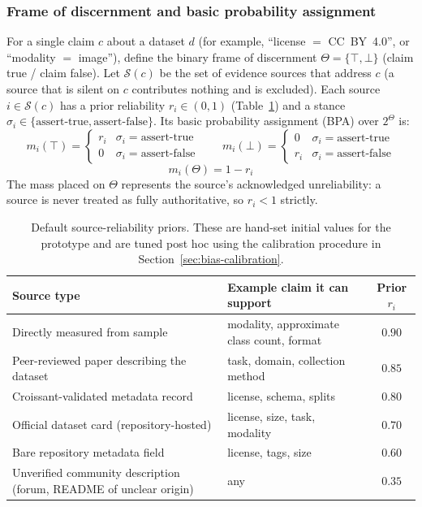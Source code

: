 \documentclass[11pt]{article}
\begin{document}
\subsubsection{Frame of discernment and basic probability assignment}
For a single claim $c$ about a dataset $d$ (for example, ``license $=$ CC~BY~4.0'', or ``modality $=$
image''), define the binary frame of discernment $\Theta = \{\top, \bot\}$ (claim true / claim false).
Let $\mathcal{S}(c)$ be the set of evidence sources that address $c$ (a source that is silent on $c$
contributes nothing and is excluded). Each source $i \in \mathcal{S}(c)$ has a prior reliability
$r_i \in (0,1)$ (Table~\ref{tab:reliability}) and a stance $\sigma_i \in \{\text{assert-true},
\text{assert-false}\}$. Its basic probability assignment (BPA) over $2^\Theta$ is:
\begin{equation}
m_i(\top) = \begin{cases} r_i & \sigma_i = \text{assert-true} \\ 0 & \sigma_i = \text{assert-false}\end{cases}
\qquad
m_i(\bot) = \begin{cases} 0 & \sigma_i = \text{assert-true} \\ r_i & \sigma_i = \text{assert-false}\end{cases}
\end{equation}
\begin{equation}
m_i(\Theta) = 1 - r_i
\end{equation}
The mass placed on $\Theta$ represents the source's acknowledged unreliability: a source is never treated
as fully authoritative, so $r_i < 1$ strictly.

\begin{table}[h]
\centering
\small
\begin{tabular}{@{}llc@{}}
\toprule
\textbf{Source type} & \textbf{Example claim it can support} & \textbf{Prior $r_i$} \\
\midrule
Directly measured from sample & modality, approximate class count, format & $0.90$ \\
Peer-reviewed paper describing the dataset & task, domain, collection method & $0.85$ \\
Croissant-validated metadata record & license, schema, splits & $0.80$ \\
Official dataset card (repository-hosted) & license, size, task, modality & $0.70$ \\
Bare repository metadata field & license, tags, size & $0.60$ \\
Unverified community description (forum, README of unclear origin) & any & $0.35$ \\
\bottomrule
\end{tabular}
\caption{Default source-reliability priors. These are hand-set initial values for the prototype and are
tuned post hoc using the calibration procedure in Section~\ref{sec:bias-calibration}.}
\label{tab:reliability}
\end{table}
\end{document}
